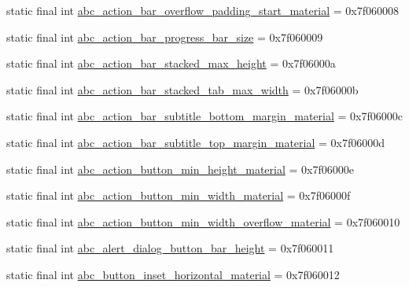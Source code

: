 \begin{DoxyCompactItemize}
\item 
static final int \mbox{\hyperlink{classandroid_1_1support_1_1design_1_1R_1_1dimen_afcc656fd9ff7526cf3a9713155929f19}{abc\+\_\+action\+\_\+bar\+\_\+overflow\+\_\+padding\+\_\+start\+\_\+material}} = 0x7f060008
\item 
static final int \mbox{\hyperlink{classandroid_1_1support_1_1design_1_1R_1_1dimen_a0841a2247b3ff85cbcaeda6ea97c0944}{abc\+\_\+action\+\_\+bar\+\_\+progress\+\_\+bar\+\_\+size}} = 0x7f060009
\item 
static final int \mbox{\hyperlink{classandroid_1_1support_1_1design_1_1R_1_1dimen_ab0160db7b64c23fb4ca25a6506556408}{abc\+\_\+action\+\_\+bar\+\_\+stacked\+\_\+max\+\_\+height}} = 0x7f06000a
\item 
static final int \mbox{\hyperlink{classandroid_1_1support_1_1design_1_1R_1_1dimen_a8dc041a733fe2e1bb35f5791f118b1e8}{abc\+\_\+action\+\_\+bar\+\_\+stacked\+\_\+tab\+\_\+max\+\_\+width}} = 0x7f06000b
\item 
static final int \mbox{\hyperlink{classandroid_1_1support_1_1design_1_1R_1_1dimen_aec33706c986e5fc925371f6eb778339c}{abc\+\_\+action\+\_\+bar\+\_\+subtitle\+\_\+bottom\+\_\+margin\+\_\+material}} = 0x7f06000c
\item 
static final int \mbox{\hyperlink{classandroid_1_1support_1_1design_1_1R_1_1dimen_ab044319f6a390e09597b7a26ca4239fa}{abc\+\_\+action\+\_\+bar\+\_\+subtitle\+\_\+top\+\_\+margin\+\_\+material}} = 0x7f06000d
\item 
static final int \mbox{\hyperlink{classandroid_1_1support_1_1design_1_1R_1_1dimen_a790b0f15fe5f2eacfa6e795235d9eae4}{abc\+\_\+action\+\_\+button\+\_\+min\+\_\+height\+\_\+material}} = 0x7f06000e
\item 
static final int \mbox{\hyperlink{classandroid_1_1support_1_1design_1_1R_1_1dimen_a37b1e3c9da74daa257a3a466f77f4af9}{abc\+\_\+action\+\_\+button\+\_\+min\+\_\+width\+\_\+material}} = 0x7f06000f
\item 
static final int \mbox{\hyperlink{classandroid_1_1support_1_1design_1_1R_1_1dimen_a44e1469815c3f215f8034a6ad69175e4}{abc\+\_\+action\+\_\+button\+\_\+min\+\_\+width\+\_\+overflow\+\_\+material}} = 0x7f060010
\item 
static final int \mbox{\hyperlink{classandroid_1_1support_1_1design_1_1R_1_1dimen_a0ac12e6518fb27a21c807a9803d7d350}{abc\+\_\+alert\+\_\+dialog\+\_\+button\+\_\+bar\+\_\+height}} = 0x7f060011
\item 
static final int \mbox{\hyperlink{classandroid_1_1support_1_1design_1_1R_1_1dimen_aa874e9a2211b7eaf3a6c6b45423ee3d5}{abc\+\_\+button\+\_\+inset\+\_\+horizontal\+\_\+material}} = 0x7f060012

\end{DoxyCompactItemize}
